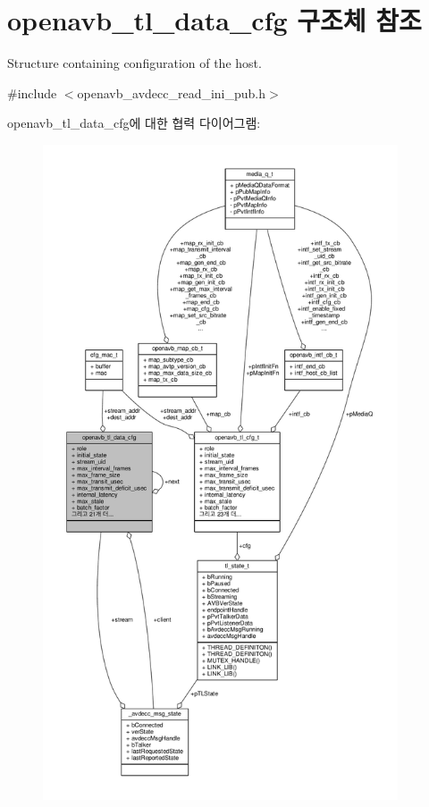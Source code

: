 \hypertarget{structopenavb__tl__data__cfg}{}\section{openavb\+\_\+tl\+\_\+data\+\_\+cfg 구조체 참조}
\label{structopenavb__tl__data__cfg}


Structure containing configuration of the host.  




{\ttfamily \#include $<$openavb\+\_\+avdecc\+\_\+read\+\_\+ini\+\_\+pub.\+h$>$}



openavb\+\_\+tl\+\_\+data\+\_\+cfg에 대한 협력 다이어그램\+:
\nopagebreak
\begin{figure}[H]
\begin{center}
\leavevmode
\includegraphics[height=550pt]{structopenavb__tl__data__cfg__coll__graph}
\end{center}
\end{figure}
